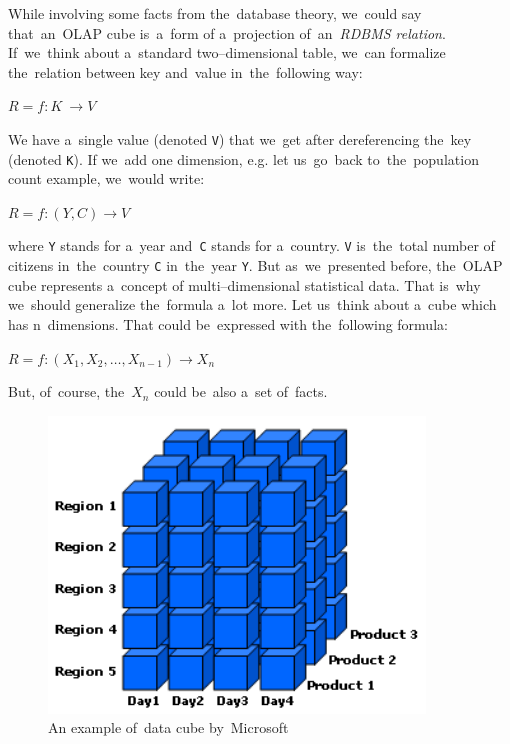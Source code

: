 \begin{sloppypar}
While involving some facts from the~database theory, we~could say that~an~OLAP cube is~a~form
of a~projection of~an~\emph{RDBMS relation}. If~we~think about a~standard two--dimensional table, we~can
formalize the~relation between key and~value in~the~following way:
\end{sloppypar}

\begin{center}
$R = f: K~\rightarrow V$
\end{center}

We have a~single value (denoted \texttt{V}) that we~get after dereferencing the~key (denoted \texttt{K}).
If we~add one dimension, e.g. let us~go~back to~the~population count example, we~would write:

\begin{center}
$R = f: (Y,C) \rightarrow V$
\end{center}

where \texttt{Y} stands for a~year and~\texttt{C} stands for a~country. \texttt{V} is~the~total number of
citizens in~the~country \texttt{C} in~the~year \texttt{Y}.
But as~we~presented before, the~OLAP cube represents a~concept of
multi--dimensional statistical data. That is~why we~should generalize the~formula a~lot more.
Let us~think about a~cube which has n~dimensions. That could be~expressed with the~following
formula:

\begin{center}
$R = f: (X_{1}, X_{2}, …, X_{n-1}) \rightarrow X_{n}$
\end{center}

But, of~course, the~$X_{n}$ could be~also a~set of~facts.


\begin{figure}
	\centering
	\includegraphics[width=100mm]{img/data-cube.png}
	\caption{An example of~data cube by~Microsoft~\cite{msdn-cube}}
	\label{fig:lod-cloud}
\end{figure}

